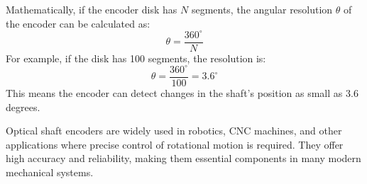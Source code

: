 Mathematically, if the encoder disk has \( N \) segments, the angular resolution \( \theta \) of the encoder can be calculated as:
\[
\theta = \frac{360^\circ}{N}
\]
For example, if the disk has 100 segments, the resolution is:
\[
\theta = \frac{360^\circ}{100} = 3.6^\circ
\]
This means the encoder can detect changes in the shaft's position as small as 3.6 degrees.

Optical shaft encoders are widely used in robotics, CNC machines, and other applications where precise control of rotational motion is required. They offer high accuracy and reliability, making them essential components in many modern mechanical systems.

